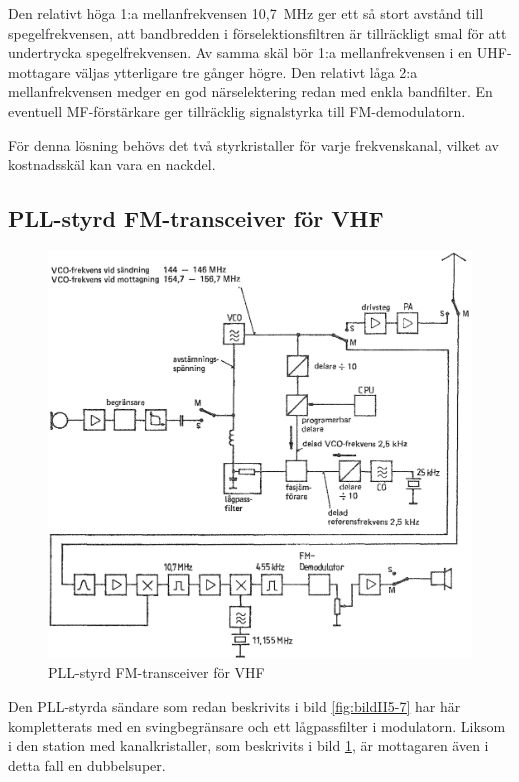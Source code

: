 Den relativt höga 1:a mellanfrekvensen 10,7~MHz ger ett så stort
avstånd till spegelfrekvensen, att bandbredden i förselektionsfiltren
är tillräckligt smal för att undertrycka spegelfrekvensen.
Av samma skäl bör 1:a mellanfrekvensen i en UHF-mottagare väljas ytterligare
tre gånger högre.
Den relativt låga 2:a mellanfrekvensen medger en god närselektering
redan med enkla bandfilter.
En eventuell MF-förstärkare ger tillräcklig signalstyrka till FM-demodulatorn.

För denna lösning behövs det två styrkristaller för varje
frekvenskanal, vilket av kostnadsskäl kan vara en nackdel.

\subsection{PLL-styrd FM-transceiver för VHF}

\begin{figure}
  \includegraphics[width=\textwidth]{images/cropped_pdfs/bild_2_5-13.pdf}
  \caption{PLL-styrd FM-transceiver för VHF}
  \label{fig:bildII5-13}
\end{figure}

Den PLL-styrda sändare som redan beskrivits i bild \ref{fig:bildII5-7} har här
kompletterats med en svingbegränsare och ett lågpassfilter i modulatorn.
Liksom i den station med kanalkristaller, som beskrivits i
bild \ref{fig:bildII5-13}, är mottagaren även i detta fall en dubbelsuper.

